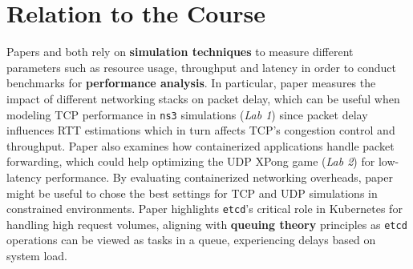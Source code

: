 \section{Relation to the Course}%
\label{sec:Relation to the Course}

Papers \cite{C1} and \cite{C3} both rely on \textbf{simulation techniques} to measure different parameters such as resource usage, throughput and latency in order to conduct benchmarks for \textbf{performance analysis}. In particular, paper \cite{C1} measures the impact of different networking stacks on packet delay, which can be useful when modeling TCP performance in \texttt{ns3} simulations (\textit{Lab 1}) since packet delay influences RTT estimations which in turn affects TCP's congestion control and throughput. Paper \cite{C1} also examines how containerized applications handle packet forwarding, which could help optimizing the UDP XPong game (\textit{Lab 2}) for low-latency performance. 
By evaluating containerized networking overheads, paper \cite{C3} might be useful to chose the best settings for TCP and UDP simulations in constrained environments. 
Paper \cite{C2} highlights \texttt{etcd}'s critical role in Kubernetes for handling high request volumes, aligning with \textbf{queuing theory} principles as \texttt{etcd} operations can be viewed as tasks in a queue, experiencing delays based on system load.
